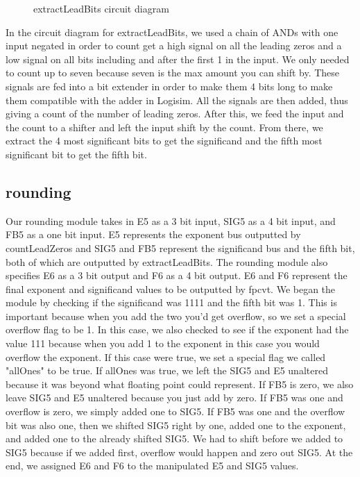 \documentclass{article}
\begin{document}
\begin{figure}[H]
	\begin{center}
		\caption{extractLeadBits circuit diagram}
	\end{center}
\end{figure}

In the circuit diagram for extractLeadBits, we used a chain of ANDs with one input negated in order to count get a high signal on all the leading zeros and a low signal on all bits including and after the first 1 in the input. We only needed to count up to seven because seven is the max amount you can shift by. These signals are fed into a bit extender in order to make them 4 bits long to make them compatible with the adder in Logisim. All the signals are then added, thus giving a count of the number of leading zeros. After this, we feed the input and the count to a shifter and left the input shift by the count. From there, we extract the 4 most significant bits to get the significand and the fifth most significant bit to get the fifth bit.

\subsection*{rounding}
Our rounding module takes in E5 as a 3 bit input, SIG5 as a 4 bit input, and FB5 as a one bit input. E5 represents the exponent bus outputted by countLeadZeros and SIG5 and FB5 represent the significand bus and the fifth bit, both of which are outputted by extractLeadBits. The rounding module also specifies E6 as a 3 bit output and F6 as a 4 bit output. E6 and F6 represent the final exponent and significand values to be outputted by fpcvt. We began the module by checking if the significand was 1111 and the fifth bit was 1. This is important because when you add the two you'd get overflow, so we set a special overflow flag to be 1. In this case, we also checked to see if the exponent had the value 111 because when you add 1 to the exponent in this case you would overflow the exponent. If this case were true, we set a special flag we called "allOnes" to be true. If allOnes was true, we left the SIG5 and E5 unaltered because it was beyond what floating point could represent. If FB5 is zero, we also leave SIG5 and E5 unaltered because you just add by zero. If FB5 was one and overflow is zero, we simply added one to SIG5. If FB5 was one and the overflow bit was also one, then we shifted SIG5 right by one, added one to the exponent, and added one to the already shifted SIG5. We had to shift before we added to SIG5 because if we added first, overflow would happen and zero out SIG5. At the end, we assigned E6 and F6 to the manipulated E5 and SIG5 values.
\end{document}
